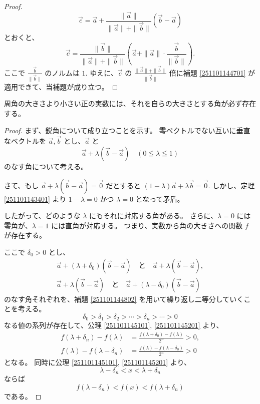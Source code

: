 \begin{proof}
  \[\vec{c}=\vec{a}+\frac{\|\vec{a}\|}{\|\vec{a}\|+\|\vec{b}\|}(\vec{b}-\vec{a})\]
  とおくと、
  \[\vec{c}=\frac{\|\vec{b}\|}{\|\vec{a}\|+\|\vec{b}\|}\left(\vec{a}+\|\vec{a}\|\cdot\frac{\vec{b}}{\|\vec{b}\|}\right).\]
  ここで \(\displaystyle \frac{\vec{b}}{\|\vec{b}\|}\) のノルムは \(1.\)
  ゆえに、\(\vec{c}\) の \(\displaystyle \frac{\|\vec{a}\|+\|\vec{b}\|}{\|\vec{b}\|}\) 倍に補題 \ref{251101144701} が適用できて、当補題が成り立つ。
\end{proof}

\begin{thm}
 周角の大きさより小さい正の実数には、それを自らの大きさとする角が必ず存在する。
\end{thm}

\begin{proof}
  まず、鋭角について成り立つことを示す。
  零ベクトルでない互いに垂直なベクトルを \(\vec{a},\vec{b}\) とし、\(\vec{a}\) と
  \[\vec{a}+\lambda(\vec{b}-\vec{a}) \quad (0\leqq\lambda\leqq1)\]
  のなす角について考える。

  さて、もし \(\vec{a}+\lambda(\vec{b}-\vec{a})=\vec{0}\) だとすると \((1-\lambda)\vec{a}+\lambda\vec{b}=\vec{0}.\) しかし、定理 \ref{251101143401} より \(1-\lambda=0\) かつ \(\lambda=0\) となって矛盾。

  したがって、どのような \(\lambda\) にもそれに対応する角がある。
  さらに、\(\lambda=0\) には零角が、\(\lambda=1\) には直角が対応する。
  つまり、実数から角の大きさへの関数 \(f\) が存在する。

  ここで \(\delta_0>0\) とし、
  \begin{gather*}
    \vec{a}+(\lambda+\delta_0)(\vec{b}-\vec{a}) \quad \text{と} \quad \vec{a}+\lambda(\vec{b}-\vec{a}), \\
    \vec{a}+\lambda(\vec{b}-\vec{a}) \quad \text{と} \quad \vec{a}+(\lambda-\delta_0)(\vec{b}-\vec{a})
  \end{gather*}
  のなす角それぞれを、補題 \ref{251101144802} を用いて繰り返し二等分していくことを考える。
  \[\delta_0>\delta_1>\delta_2>\cdots>\delta_n>\cdots>0\]
  なる値の系列が存在して、公理 \ref{251101145101}, \ref{251101145201} より、
  \begin{align*}
    f(\lambda+\delta_n)-f(\lambda) &= \frac{f(\lambda+\delta_0)-f(\lambda)}{2^n}>0, \\
    f(\lambda)-f(\lambda-\delta_n) &= \frac{f(\lambda)-f(\lambda-\delta_0)}{2^n}>0
  \end{align*}
  となる。
  同時に公理 \ref{251101145101}, \ref{251101145201} より、
  \[\lambda-\delta_n<x<\lambda+\delta_n\]
  ならば
  \[f(\lambda-\delta_n)<f(x)<f(\lambda+\delta_n)\]
  である。


\end{proof}
